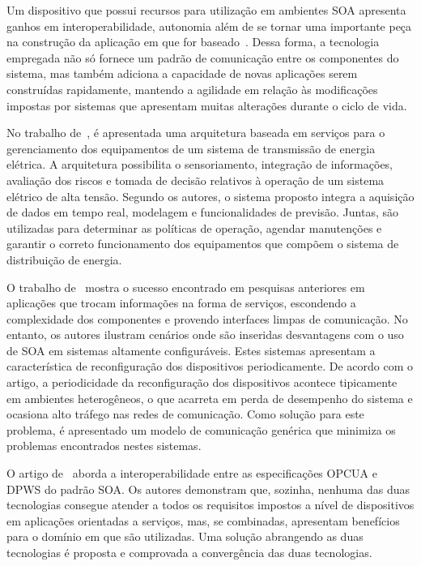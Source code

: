 Um dispositivo que possui recursos para utilização em ambientes \gls{SOA} apresenta ganhos em
interoperabilidade, autonomia além de se tornar uma importante peça na construção da aplicação em
que for baseado~\cite{candido2010industrial}. Dessa forma, a tecnologia empregada não só fornece um
padrão de comunicação entre os componentes do sistema, mas também adiciona a capacidade de novas
aplicações serem construídas rapidamente, mantendo a agilidade em relação às modificações impostas
por sistemas que apresentam muitas alterações durante o ciclo de vida.

No trabalho de~\cite{pathak2007service-oriented}, é apresentada uma arquitetura baseada em serviços
para o gerenciamento dos equipamentos de um sistema de transmissão de energia elétrica. A
arquitetura possibilita o sensoriamento, integração de informações, avaliação dos riscos e tomada de
decisão relativos à operação de um sistema elétrico de alta tensão. Segundo os autores, o sistema
proposto integra a aquisição de dados em tempo real, modelagem e funcionalidades de previsão.
Juntas, são utilizadas para determinar as políticas de operação, agendar manutenções e garantir o
correto funcionamento dos equipamentos que compõem o sistema de distribuição de energia.

O trabalho de~\cite{ribeiro2008generic} mostra o sucesso encontrado em pesquisas anteriores em
aplicações que trocam informações na forma de serviços, escondendo a complexidade dos componentes e
provendo interfaces limpas de comunicação. No entanto, os autores ilustram cenários onde são
inseridas desvantagens com o uso de \gls{SOA} em sistemas altamente configuráveis. Estes sistemas
apresentam a característica de reconfiguração dos dispositivos periodicamente. De acordo com o
artigo, a periodicidade da reconfiguração dos dispositivos acontece tipicamente em ambientes
heterogêneos, o que acarreta em perda de desempenho do sistema e ocasiona alto tráfego nas redes de
comunicação. Como solução para este problema, é apresentado um modelo de comunicação genérica que
minimiza os problemas encontrados nestes sistemas.

O artigo de~\cite{candido2010soa} aborda a interoperabilidade entre as especificações \gls{OPCUA} e
\gls{DPWS} do padrão \gls{SOA}. Os autores demonstram que, sozinha, nenhuma das duas tecnologias
consegue atender a todos os requisitos impostos a nível de dispositivos em aplicações orientadas a
serviços, mas, se combinadas, apresentam benefícios para o domínio em que são utilizadas. Uma
solução abrangendo as duas tecnologias é proposta e comprovada a convergência das duas tecnologias.

